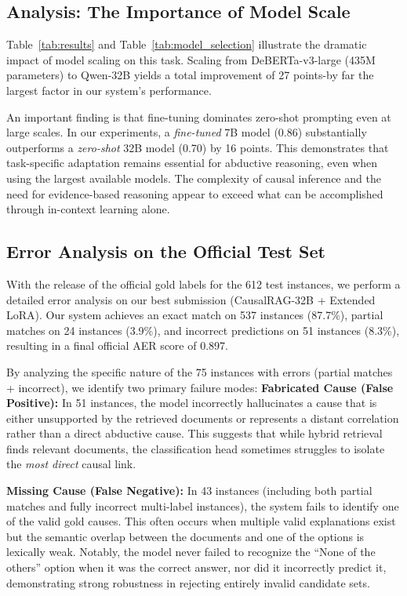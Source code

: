 \documentclass[11pt]{article}
\begin{document}
\subsection{Analysis: The Importance of Model Scale}

Table~\ref{tab:results} and Table~\ref{tab:model_selection} illustrate the dramatic impact of model scaling on this task. Scaling from DeBERTa-v3-large (435M parameters) to Qwen-32B yields a total improvement of 27 points-by far the largest factor in our system's performance.

An important finding is that fine-tuning dominates zero-shot prompting even at large scales. In our experiments, a \textit{fine-tuned} 7B model (0.86) substantially outperforms a \textit{zero-shot} 32B model (0.70) by 16 points. This demonstrates that task-specific adaptation remains essential for abductive reasoning, even when using the largest available models. The complexity of causal inference and the need for evidence-based reasoning appear to exceed what can be accomplished through in-context learning alone.

\subsection{Error Analysis on the Official Test Set}

With the release of the official gold labels for the 612 test instances, we perform a detailed error analysis on our best submission (CausalRAG-32B + Extended LoRA). Our system achieves an exact match on 537 instances (87.7\%), partial matches on 24 instances (3.9\%), and incorrect predictions on 51 instances (8.3\%), resulting in a final official AER score of 0.897. 

By analyzing the specific nature of the 75 instances with errors (partial matches + incorrect), we identify two primary failure modes:
\textbf{Fabricated Cause (False Positive):} In 51 instances, the model incorrectly hallucinates a cause that is either unsupported by the retrieved documents or represents a distant correlation rather than a direct abductive cause. This suggests that while hybrid retrieval finds relevant documents, the classification head sometimes struggles to isolate the \textit{most direct} causal link.

\textbf{Missing Cause (False Negative):} In 43 instances (including both partial matches and fully incorrect multi-label instances), the system fails to identify one of the valid gold causes. This often occurs when multiple valid explanations exist but the semantic overlap between the documents and one of the options is lexically weak.
Notably, the model never failed to recognize the ``None of the others'' option when it was the correct answer, nor did it incorrectly predict it, demonstrating strong robustness in rejecting entirely invalid candidate sets.
\end{document}
